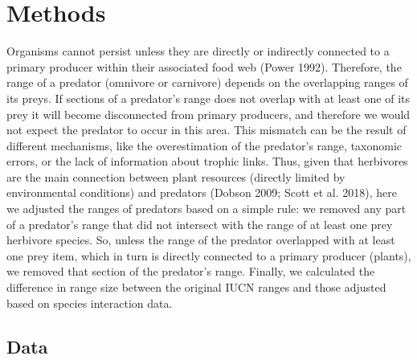 \documentclass[10pt,oneside]{article}
\begin{document}
\hypertarget{methods}{%
\section{Methods}\label{methods}}

Organisms cannot persist unless they are directly or indirectly
connected to a primary producer within their associated food web (Power
1992). Therefore, the range of a predator (omnivore or carnivore)
depends on the overlapping ranges of its preys. If sections of a
predator's range does not overlap with at least one of its prey it will
become disconnected from primary producers, and therefore we would not
expect the predator to occur in this area. This mismatch can be the
result of different mechanisms, like the overestimation of the
predator's range, taxonomic errors, or the lack of information about
trophic links. Thus, given that herbivores are the main connection
between plant resources (directly limited by environmental conditions)
and predators (Dobson 2009; Scott et al. 2018), here we adjusted the
ranges of predators based on a simple rule: we removed any part of a
predator's range that did not intersect with the range of at least one
prey herbivore species. So, unless the range of the predator overlapped
with at least one prey item, which in turn is directly connected to a
primary producer (plants), we removed that section of the predator's
range. Finally, we calculated the difference in range size between the
original IUCN ranges and those adjusted based on species interaction
data.

\hypertarget{data}{%
\subsection{Data}\label{data}}
\end{document}
